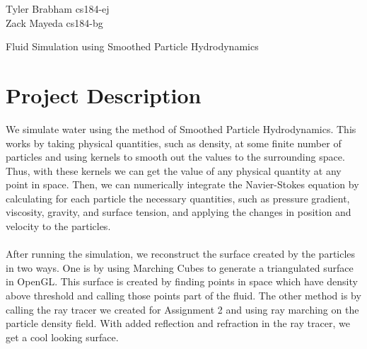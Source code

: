 \documentclass[12pt]{article}
\begin{document}
\begin{flushright}
\large
Tyler Brabham cs184-ej\\
Zack Mayeda cs184-bg
\end{flushright}

\begin{center}
\Large
Fluid Simulation using Smoothed Particle Hydrodynamics
\end{center}

\section*{Project Description}
We simulate water using the method of Smoothed Particle Hydrodynamics. This works by taking physical quantities, such as density, at some finite number of particles and using kernels to smooth out the values to the surrounding space. Thus, with these kernels we can get the value of any physical quantity at any point in space. Then, we can numerically integrate the Navier-Stokes equation by calculating for each particle the necessary quantities, such as pressure gradient, viscosity, gravity, and surface tension, and applying the changes in position and velocity to the particles.
\\ \\
After running the simulation, we reconstruct the surface created by the particles in two ways. One is by using Marching Cubes to generate a triangulated surface in OpenGL. This surface is created by finding points in space which have density above threshold and calling those points part of the fluid. The other method is by calling the ray tracer we created for Assignment 2 and using ray marching on the particle density field. With added reflection and refraction in the ray tracer, we get a cool looking surface.
\end{document}

